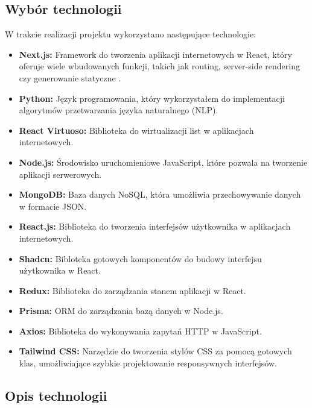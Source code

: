 \subsection{Wybór technologii}
W trakcie realizacji projektu wykorzystano następujące technologie:
\begin{itemize}
    \item \textbf{Next.js:} Framework do tworzenia aplikacji internetowych w React, który oferuje wiele wbudowanych funkcji, takich jak routing, server-side rendering czy generowanie statyczne \cite{nextjs}.
    \item \textbf{Python:} Język programowania, który wykorzystałem do implementacji algorytmów przetwarzania języka naturalnego (NLP).
    \item \textbf{React Virtuoso:} Biblioteka do wirtualizacji list w aplikacjach internetowych.
    \item \textbf{Node.js:} Środowisko uruchomieniowe JavaScript, które pozwala na tworzenie aplikacji serwerowych.
    \item \textbf{MongoDB:} Baza danych NoSQL, która umożliwia przechowywanie danych w formacie JSON.
    \item \textbf{React.js:} Biblioteka do tworzenia interfejsów użytkownika w aplikacjach internetowych.
    \item \textbf{Shadcn:} Bibloteka gotowych komponentów do budowy interfejsu użytkownika w React.
    \item \textbf{Redux:} Biblioteka do zarządzania stanem aplikacji w React.
    \item \textbf{Prisma:} ORM do zarządzania bazą danych w Node.js.
    \item \textbf{Axios:} Biblioteka do wykonywania zapytań HTTP w JavaScript.
    \item \textbf{Tailwind CSS:} Narzędzie do tworzenia stylów CSS za pomocą gotowych klas, umożliwiające szybkie projektowanie responsywnych interfejsów.
\end{itemize}

\subsection{Opis technologii}
